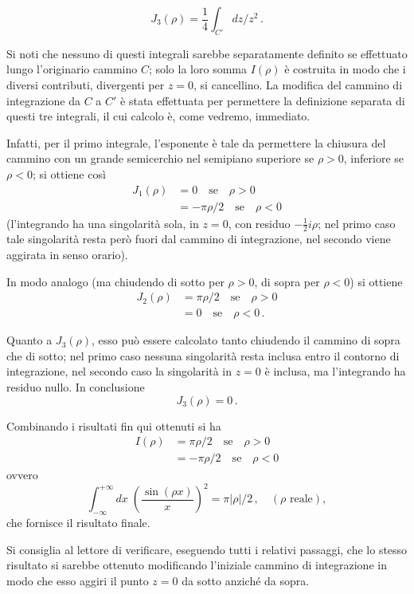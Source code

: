 \documentclass[11pt, a4paper]{book}
\numberwithin{equation}{section}
\begin{document}
\[
J_3(\rho) = \frac{1}{4} \int_{C'} dz \big/ z^2\,.
\]

Si noti che nessuno di questi integrali sarebbe separatamente definito se effettuato lungo l'originario cammino $C$; solo la loro somma $I(\rho)$ è costruita in modo che i diversi contributi, divergenti per $z=0$, si cancellino. La modifica del cammino di integrazione da $C$ a $C'$ è stata effettuata per permettere la definizione separata di questi tre integrali, il cui calcolo è, come vedremo, immediato.

Infatti, per il primo integrale, l'esponente è tale da permettere la chiusura del cammino con un grande semicerchio nel semipiano superiore se $\rho > 0$, inferiore se $\rho < 0$; si ottiene così
\begin{align*}
J_1(\rho) &= 0 \quad \text{se} \quad \rho > 0 \\
&= -\pi\rho/2 \quad \text{se} \quad \rho < 0
\end{align*}
(l'integrando ha una singolarità sola, in $z=0$, con residuo $-\frac{1}{2}i\rho$; nel primo caso tale singolarità resta però fuori dal cammino di integrazione, nel secondo viene aggirata in senso orario).

In modo analogo (ma chiudendo di sotto per $\rho > 0$, di sopra per $\rho < 0$) si ottiene
\begin{align*}
J_2(\rho) &= \pi\rho/2 \quad \text{se} \quad \rho > 0 \\
&= 0 \quad \text{se} \quad \rho < 0\,.
\end{align*}

Quanto a $J_3(\rho)$, esso può essere calcolato tanto chiudendo il cammino di sopra che di sotto; nel primo caso nessuna singolarità resta inclusa entro il contorno di integrazione, nel secondo caso la singolarità in $z=0$ è inclusa, ma l'integrando ha residuo nullo. In conclusione
\[
J_3(\rho) = 0\,.
\]

Combinando i risultati fin qui ottenuti si ha
\begin{align*}
I(\rho) &= \pi\rho/2 \quad \text{se} \quad \rho > 0 \\
&= -\pi\rho/2 \quad \text{se} \quad \rho < 0
\end{align*}
ovvero
\[
\int_{-\infty}^{+\infty} dx\; \left(\frac{\sin(\rho x)}{x}\right)^2 = \pi|\rho|/2\,, \quad (\rho \text{ reale}),
\]
che fornisce il risultato finale.

Si consiglia al lettore di verificare, eseguendo tutti i relativi passaggi, che lo stesso risultato si sarebbe ottenuto modificando l'iniziale cammino di integrazione in modo che esso aggiri il punto $z=0$ da sotto anziché da sopra.
\end{document}

